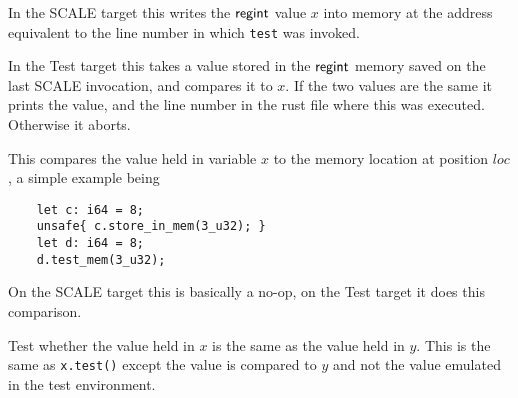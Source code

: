 In the SCALE target this writes the $\mathsf{regint}$ value $x$
into memory at the address equivalent to the line number in
which \verb|test| was invoked.

In the Test target this takes a value stored in the $\mathsf{regint}$
memory saved on the last SCALE invocation, and compares it to
$x$. If the two values are the same it prints the value, and the
line number in the rust file where this was executed.
Otherwise it aborts.

This compares the value held in variable $x$ to the memory location
at position $loc$, a simple example being
\begin{lstlisting}
    let c: i64 = 8;
    unsafe{ c.store_in_mem(3_u32); }
    let d: i64 = 8;
    d.test_mem(3_u32);
\end{lstlisting}
On the SCALE target this is basically a no-op, on the Test target
it does this comparison.

Test whether the value held in $x$ is the same as the value held in $y$.
This is the same as \verb|x.test()| except the value is compared to
$y$ and not the value emulated in the test environment.
